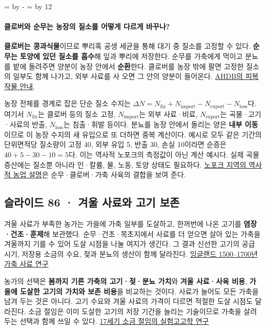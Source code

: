 \documentclass[10pt,a4paper]{article}
\newcommand{\ReserveQuestionSpace}{%
  \par\begingroup
  \dimen0=\pagegoal \advance\dimen0 by -\pagetotal
  \dimen2=\baselineskip \multiply\dimen2 by 12
  \ifdim\dimen0<\dimen2 \newpage\fi
  \endgroup}
\begin{document}
\ReserveQuestionSpace
\paragraph{클로버와 순무는 농장의 질소를 어떻게 다르게 바꾸나?}
\textbf{클로버는 콩과식물}이므로 뿌리혹 공생 세균을 통해 대기 중 질소를 고정할 수 있다. \textbf{순무는 토양에 있던 질소를 흡수}해 잎과 뿌리에 저장한다. 순무를 가축에게 먹이고 분뇨를 밭에 돌려주면 양분이 농장 안에서 \textbf{순환}한다. 클로버를 농장 밖에 팔면 고정한 질소의 일부도 함께 나가고, 외부 사료를 사 오면 그 안의 양분이 들어온다. \href{https://ahdb.org.uk/knowledge-library/cover-crops-to-improve-soil-fertility}{AHDB의 피복작물 안내}.\par

농장 전체를 경계로 잡은 단순 질소 수지는 $\Delta N=N_{\mathrm{fix}}+N_{\mathrm{import}}-N_{\mathrm{export}}-N_{\mathrm{loss}}$다. 여기서 $N_{\mathrm{fix}}$는 클로버 등의 질소 고정, $N_{\mathrm{import}}$는 외부 사료·비료, $N_{\mathrm{export}}$는 곡물·고기·사료의 반출, $N_{\mathrm{loss}}$는 침출·휘발 등이다. 분뇨를 농장 안에서 돌리는 양은 \textbf{내부 이동}이므로 이 농장 수지의 새 유입으로 또 더하면 중복 계산이다. 예시로 모두 같은 기간의 단위면적당 질소량이 고정 40, 외부 유입 5, 반출 30, 손실 10이라면 순증은 $40+5-30-10=5$다. 이는 역사적 노포크의 측정값이 아닌 계산 예시다. 실제 곡물 증산에는 질소뿐 아니라 인·칼륨, 물, 노동, 토양 상태도 필요하다. \href{https://historicengland.org.uk/images-books/publications/historic-farmsteads-preliminary-character-statement-east-of-england/historic-farmsteads-east-england-part2/}{노포크 지역의 역사적 농업 설명}은 순무·클로버·가축 사육의 결합을 보여 준다.\par

\subsection{슬라이드 86 · 겨울 사료와 고기 보존}
겨울 사료가 부족한 농가는 가을에 가축 일부를 도살하고, 한꺼번에 나온 고기를 \textbf{염장·건조·훈제}해 보관했다. 순무·건초·목초지에서 사료를 더 얻으면 살아 있는 가축을 겨울까지 기를 수 있어 도살 시점을 나눌 여지가 생긴다. 그 결과 신선한 고기의 공급 시기, 저장용 소금의 수요, 젖과 분뇨의 생산이 함께 달라진다. \href{https://bahs.org.uk/AGHR/VOLUMES/AGHR28.pdf}{잉글랜드 1500–1700년 가축 사료 연구}\par

농가의 선택은 \textbf{봄까지 기른 가축의 고기·젖·분뇨 가치}와 \textbf{겨울 사료·사육 비용}, \textbf{가을에 도살한 고기의 가치와 보존 비용}을 비교하는 것이다. 사료가 늘어도 모든 가축을 남겨 두는 것은 아니다. 고기 수요와 겨울 사료의 가격이 다르면 적절한 도살 시점도 달라진다. 소금 절임은 이미 도살한 고기의 저장 기간을 늘리는 기술이므로 가축을 살려 두는 선택과 함께 쓰일 수 있다. \href{https://www.cambridge.org/core/journals/bjhs-themes/article/bay-salt-in-seventeenthcentury-meat-preservation-how-ethnomicrobiology-and-experimental-archaeology-help-us-understand-historical-tastes/B03EA765D6E154F37A0358274A2F72DF}{17세기 소금 절임의 실험고고학 연구}\par
\end{document}
